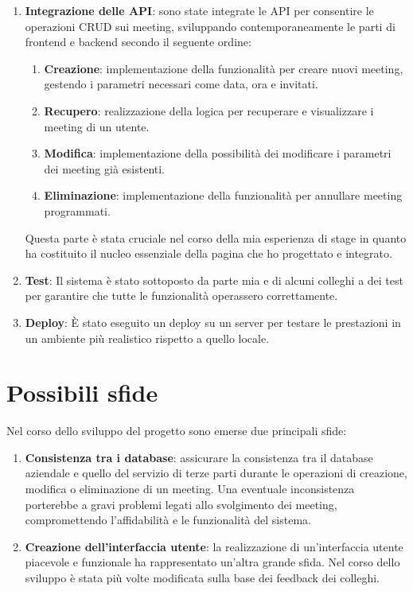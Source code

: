 \begin{enumerate}
   \item \textbf{Integrazione delle API}: sono state integrate le API per consentire le operazioni CRUD sui meeting, 
   sviluppando contemporaneamente le parti di frontend e backend secondo il seguente ordine:

      \begin{enumerate}

         \item \textbf{Creazione}: implementazione della funzionalità per creare nuovi meeting, 
         gestendo i parametri necessari come data, ora e invitati.

         \item \textbf{Recupero}: realizzazione della logica per recuperare e visualizzare i meeting di un utente.

         \item \textbf{Modifica}: implementazione della possibilità dei modificare i parametri dei meeting già esistenti.

         \item \textbf{Eliminazione}: implementazione della funzionalità per annullare meeting programmati.
      \end{enumerate}

   Questa parte è stata cruciale nel corso della mia esperienza di stage
   in quanto ha costituito il nucleo essenziale della pagina che ho progettato e integrato.

   \item \textbf{Test}: Il sistema è stato sottoposto da parte mia e di alcuni colleghi a dei test per garantire che tutte 
   le funzionalità operassero correttamente.

   \item \textbf{Deploy}:  È stato eseguito un deploy su un server per testare le prestazioni in un ambiente
   più realistico rispetto a quello locale.
\end{enumerate}

\section{Possibili sfide}
Nel corso dello sviluppo del progetto sono emerse due principali sfide:
\begin{enumerate}

   \item \textbf{Consistenza tra i database}: assicurare la consistenza tra il database aziendale e quello del servizio 
   di terze parti durante le operazioni di creazione, modifica o eliminazione di un meeting. Una eventuale inconsistenza 
   porterebbe a gravi problemi legati allo svolgimento dei meeting, compromettendo l'affidabilità e le funzionalità 
   del sistema.

   \item \textbf{Creazione dell'interfaccia utente}: la realizzazione di un'interfaccia utente piacevole e funzionale
   ha rappresentato un'altra grande sfida. Nel corso dello sviluppo è stata più volte modificata sulla base dei feedback 
   dei colleghi.
\end{enumerate} 